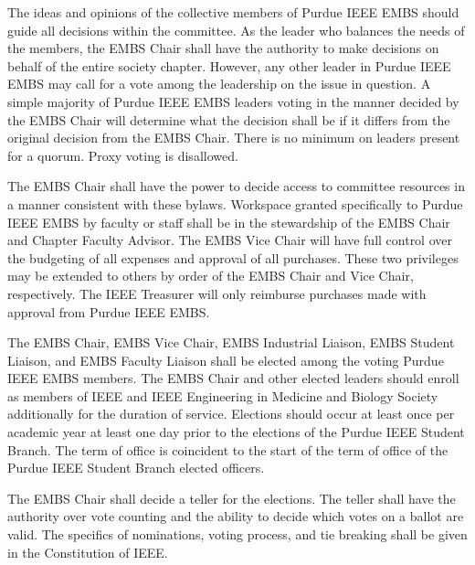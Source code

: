 \documentclass[12pt]{constitution}
\begin{document}
\label{art:decide}

The ideas and opinions of the collective members of Purdue IEEE EMBS should guide all decisions within the committee. As the leader who balances the needs of the members, the EMBS Chair shall have the authority to make decisions on behalf of the entire society chapter. However, any other leader in Purdue IEEE EMBS may call for a vote among the leadership on the issue in question. A simple majority of Purdue IEEE EMBS leaders voting in the manner decided by the EMBS Chair will determine what the decision shall be if it differs from the original decision from the EMBS Chair. There is no minimum on leaders present for a quorum. Proxy voting is disallowed.

The EMBS Chair shall have the power to decide access to committee resources in a manner consistent with these bylaws. Workspace granted specifically to Purdue IEEE EMBS by faculty or staff shall be in the stewardship of the EMBS Chair and Chapter Faculty Advisor. The EMBS Vice Chair will have full control over the budgeting of all expenses and approval of all purchases. These two privileges may be extended to others by order of the EMBS Chair and Vice Chair, respectively. The IEEE Treasurer will only reimburse purchases made with approval from Purdue IEEE EMBS.


\label{art:electdepart}

The EMBS Chair, EMBS Vice Chair, EMBS Industrial Liaison, EMBS Student Liaison, and EMBS Faculty Liaison shall be elected among the voting Purdue IEEE EMBS members. The EMBS Chair and other elected leaders should enroll as members of IEEE and IEEE Engineering in Medicine and Biology Society additionally for the duration of service. Elections should occur at least once per academic year at least one day prior to the elections of the Purdue IEEE Student Branch. The term of office is coincident to the start of the term of office of the Purdue IEEE Student Branch elected officers.

The EMBS Chair shall decide a teller for the elections. The teller shall have the authority over vote counting and the ability to decide which votes on a ballot are valid. The specifics of nominations, voting process, and tie breaking shall be given in the Constitution of IEEE.
\end{document}
